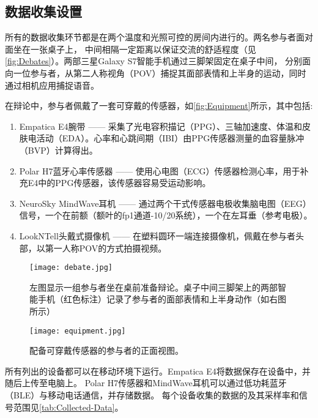 \subsection{数据收集设置}
所有的数据收集环节都是在两个温度和光照可控的房间内进行的。两名参与者面对面坐在一张桌子上，
中间相隔一定距离以保证交流的舒适程度（见\autoref{fig:Debates}）。两部三星Galaxy S7智能手机通过三脚架固定在桌子中间，
分别面向一位参与者，从第二人称视角（POV）捕捉其面部表情和上半身的运动，同时通过相机应用捕捉语音。

在辩论中，参与者佩戴了一套可穿戴的传感器，如\autoref{fig:Equipment}所示，其中包括:
\begin{enumerate}
\item Empatica E4腕带 —— 采集了光电容积描记（PPG）、三轴加速度、体温和皮肤电活动（EDA）。心率和心跳间期（IBI）由PPG传感器测量的血容量脉冲（BVP）计算得出。
\item Polar H7蓝牙心率传感器 —— 使用心电图（ECG）传感器检测心率，用于补充E4中的PPG传感器，该传感器容易受运动影响。
\item NeuroSky MindWave耳机 —— 通过两个干式传感器电极收集脑电图（EEG）信号，一个在前额（额叶的fp1通道-10/20系统），一个在左耳垂（参考电极）。
\item LookNTell头戴式摄像机 —— 在塑料圆环一端连接摄像机，佩戴在参与者头部，以第一人称POV的方式拍摄视频。
\end{enumerate}


\begin{figure}[htbp]
    \centering
    \texttt{[image: debate.jpg]}
    \caption[辩论图片]{左图显示一组参与者坐在桌前准备辩论。桌子中间三脚架上的两部智能手机（红色标注）记录了参与者的面部表情和上半身动作（如右图所示）}{\label{fig:Debates}}
\end{figure}
\begin{figure}[htbp]
    \centering
    \texttt{[image: equipment.jpg]}
    \caption[设备图片]{配备可穿戴传感器的参与者的正面视图。}{\label{fig:Equipment}}
\end{figure}

所有列出的设备都可以在移动环境下运行。Empatica E4将数据保存在设备中，并随后上传至电脑上。
Polar H7传感器和MindWave耳机可以通过低功耗蓝牙（BLE）与移动电话通信，并存储数据。
每个设备收集的数据的及其采样率和信号范围见\autoref{tab:Collected-Data}。

